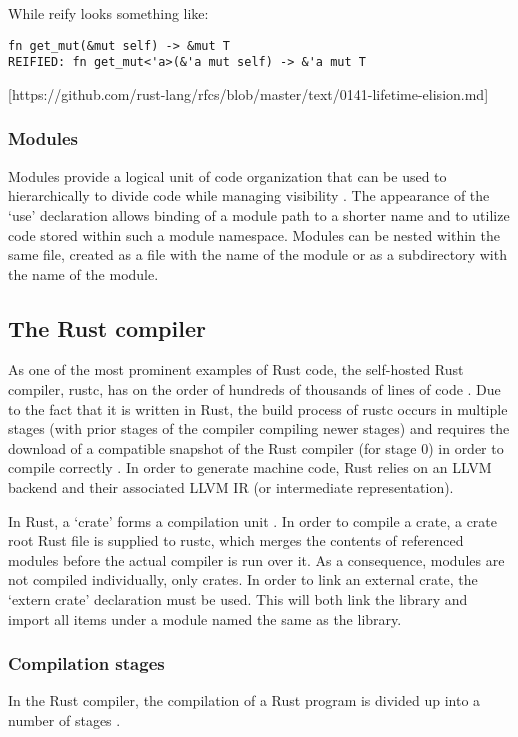 While reify looks something like:
\begin{verbatim}
fn get_mut(&mut self) -> &mut T
REIFIED: fn get_mut<'a>(&'a mut self) -> &'a mut T
\end{verbatim}

[https://github.com/rust-lang/rfcs/blob/master/text/0141-lifetime-elision.md]

\subsubsection{Modules}
Modules provide a logical unit of code organization that can be used to hierarchically to divide code while managing visibility \cite{docmod15}. The appearance of the `use' declaration allows binding of a module path to a shorter name and to utilize code stored within such a module namespace. Modules can be nested within the same file, created as a file with the name of the module or as a subdirectory with the name of the module.


\subsection{The Rust compiler}
As one of the most prominent examples of Rust code, the self-hosted Rust compiler, rustc, has on the order of hundreds of thousands of lines of code \cite{openhub15}. Due to the fact that it is written in Rust, the build process of rustc occurs in multiple stages (with prior stages of the compiler compiling newer stages) and requires the download of a compatible snapshot of the Rust compiler (for stage 0) in order to compile correctly \cite{makefile15}. In order to generate machine code, Rust relies on an LLVM backend and their associated LLVM IR (or intermediate representation).

In Rust, a `crate' forms a compilation unit \cite{examplecrates15}. In order to compile a crate, a crate root Rust file is supplied to rustc, which merges the contents of referenced modules before the actual compiler is run over it. As a consequence, modules are not compiled individually, only crates. In order to link an external crate, the `extern crate' declaration must be used. This will both link the library and import all items under a module named the same as the library. 

\subsubsection{Compilation stages}
In the Rust compiler, the compilation of a Rust program is divided up into a number of stages \cite{driver15}. 

